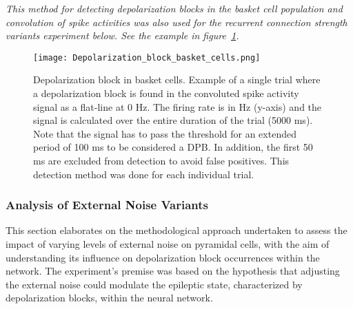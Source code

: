 \noindent
\textit{This method for detecting depolarization blocks in the basket cell population
    and convolution of spike activities was also used for the recurrent
    connection strength variants experiment below. See the example in figure~\ref{fig:depolarization_block_basket_cells}.}

\begin{figure}[htbp]
    \centering
    \texttt{[image: Depolarization\_block\_basket\_cells.png]}
    \caption[Depolarization block in basket cells]{Depolarization block in basket cells. Example of a single trial where a depolarization block is found in the convoluted spike activity signal as a flat-line at 0 Hz. The firing rate is in Hz (y-axis) and the signal is calculated over the entire duration of the trial (5000 ms).
        Note that the signal has to pass the threshold for an extended period of 100 ms to be considered a DPB\@.
        In addition, the first 50 ms are excluded from detection to avoid false positives. This detection method was done for each individual trial.}\label{fig:depolarization_block_basket_cells}
\end{figure}
\pagebreak

\subsubsection{Analysis of External Noise Variants}
This section elaborates on the methodological approach undertaken to assess the
impact of varying levels of external noise on pyramidal cells, with the aim of
understanding its influence on depolarization block occurrences within the
network. The experiment's premise was based on the hypothesis that adjusting
the external noise could modulate the epileptic state, characterized by
depolarization blocks, within the neural network.


